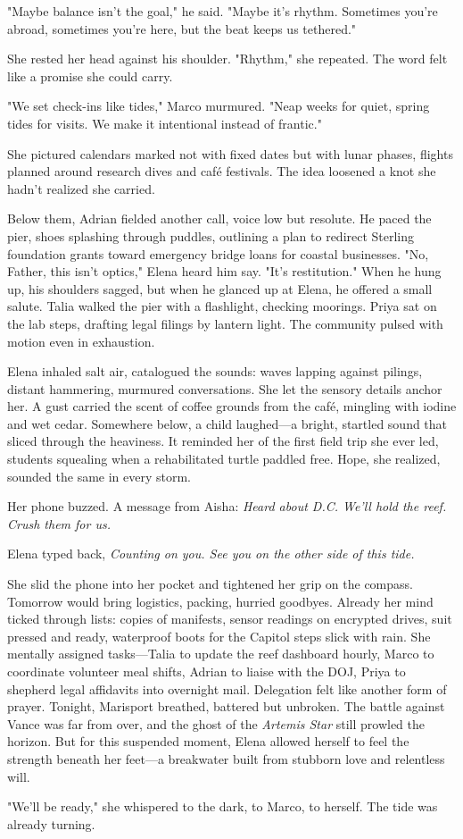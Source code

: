 "Maybe balance isn't the goal," he said. "Maybe it's rhythm. Sometimes you're abroad, sometimes you're here, but the beat keeps us tethered."

She rested her head against his shoulder. "Rhythm," she repeated. The word felt like a promise she could carry.

"We set check-ins like tides," Marco murmured. "Neap weeks for quiet, spring tides for visits. We make it intentional instead of frantic."

She pictured calendars marked not with fixed dates but with lunar phases, flights planned around research dives and café festivals. The idea loosened a knot she hadn't realized she carried.

Below them, Adrian fielded another call, voice low but resolute. He paced the pier, shoes splashing through puddles, outlining a plan to redirect Sterling foundation grants toward emergency bridge loans for coastal businesses. "No, Father, this isn't optics," Elena heard him say. "It's restitution." When he hung up, his shoulders sagged, but when he glanced up at Elena, he offered a small salute. Talia walked the pier with a flashlight, checking moorings. Priya sat on the lab steps, drafting legal filings by lantern light. The community pulsed with motion even in exhaustion.

Elena inhaled salt air, catalogued the sounds: waves lapping against pilings, distant hammering, murmured conversations. She let the sensory details anchor her. A gust carried the scent of coffee grounds from the café, mingling with iodine and wet cedar. Somewhere below, a child laughed—a bright, startled sound that sliced through the heaviness. It reminded her of the first field trip she ever led, students squealing when a rehabilitated turtle paddled free. Hope, she realized, sounded the same in every storm.

Her phone buzzed. A message from Aisha: \textit{Heard about D.C. We'll hold the reef. Crush them for us.}

Elena typed back, \textit{Counting on you. See you on the other side of this tide.}

She slid the phone into her pocket and tightened her grip on the compass. Tomorrow would bring logistics, packing, hurried goodbyes. Already her mind ticked through lists: copies of manifests, sensor readings on encrypted drives, suit pressed and ready, waterproof boots for the Capitol steps slick with rain. She mentally assigned tasks—Talia to update the reef dashboard hourly, Marco to coordinate volunteer meal shifts, Adrian to liaise with the DOJ, Priya to shepherd legal affidavits into overnight mail. Delegation felt like another form of prayer. Tonight, Marisport breathed, battered but unbroken. The battle against Vance was far from over, and the ghost of the \textit{Artemis Star} still prowled the horizon. But for this suspended moment, Elena allowed herself to feel the strength beneath her feet—a breakwater built from stubborn love and relentless will.

"We'll be ready," she whispered to the dark, to Marco, to herself. The tide was already turning.
